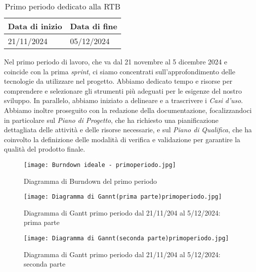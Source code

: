 \begin{table}[h!]
    \centering
    \renewcommand{\arraystretch}{1.5} %
    \begin{tabularx}{\textwidth}{|X|X|}\hline
    \rowcolor[HTML]{FFD700} 
    \textbf{Data di inizio} & \textbf{Data di fine} \\ \hline
    21/11/2024 & 05/12/2024 \\ \hline
    \end{tabularx}
    \caption{Primo periodo dedicato alla RTB}
\end{table}
Nel primo periodo di lavoro, che va dal 21 novembre al 5 dicembre 2024 e coincide con la prima \textit{sprint}, 
ci siamo concentrati sull'approfondimento delle tecnologie da utilizzare nel progetto. 
Abbiamo dedicato tempo e risorse per comprendere e selezionare gli strumenti più adeguati per le esigenze del nostro sviluppo. In parallelo, abbiamo iniziato a delineare e a trascrivere i \textit{Casi d'uso}.
Abbiamo inoltre proseguito con la redazione della documentazione, focalizzandoci in particolare sul \textit{Piano di Progetto}, che ha richiesto una pianificazione dettagliata delle attività e delle risorse necessarie, e sul \textit{Piano di Qualifica}, che ha coinvolto la definizione delle modalità di verifica e validazione per garantire la qualità del prodotto finale.
\newpage
\begin{figure}[h] 
    \centering
    \texttt{[image: Burndown ideale - primoperiodo.jpg]}
    \caption{Diagramma di Burndown del primo periodo} 
    \label{fig: Diagramma di Burndown del primo periodo}
\end{figure}
\newpage
\begin{figure}[h] 
    \centering
    \texttt{[image: Diagramma di Gannt(prima parte)primoperiodo.jpg]}
    \caption{Diagramma di Gantt primo periodo dal 21/11/204 al 5/12/2024: prima parte} 
    \label{fig: Diagramma di Gantt primo periodo dal 21/11/204 al 5/12/2024: prima parte}
\end{figure}
\newpage


\begin{figure}[h] 
    \centering
    \texttt{[image: Diagramma di Gannt(seconda parte)primoperiodo.jpg]}
    \caption{Diagramma di Gantt primo periodo dal 21/11/204 al 5/12/2024: seconda parte} 
    \label{fig: Diagramma di Gantt primo periodo dal 21/11/204 al 5/12/2024: seconda parte}
\end{figure}

